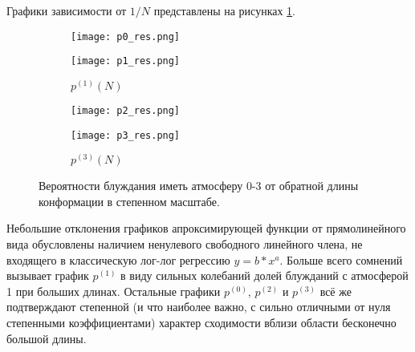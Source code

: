 Графики зависимости от $1/N$ представлены на рисунках \ref{fig:p_03_loglog}.

\begin{figure}[h]
\centering
\begin{subfigure}{0.495\textwidth}
\texttt{[image: p0\_res.png]}
\caption{$p^{(0)}(N)$}
\texttt{[image: p1\_res.png]}
\caption{$p^{(1)}(N)$}
\end{subfigure}
\hfill
\begin{subfigure}{0.495\textwidth}
\centering
\texttt{[image: p2\_res.png]}
\caption{$p^{(2)}(N)$}
\texttt{[image: p3\_res.png]}
\caption{$p^{(3)}(N)$}
\end{subfigure}
\caption{Вероятности блуждания иметь атмосферу 0-3 от обратной длины конформации в степенном масштабе.}
\label{fig:p_03_loglog}
\end{figure}

Небольшие отклонения графиков апроксимирующей функции от прямолинейного вида обусловлены наличием ненулевого свободного линейного члена,
не входящего в классическую лог-лог регрессию $y = b * x^a$.
Больше всего сомнений вызывает график $p^{(1)}$ в виду сильных колебаний долей блужданий с атмосферой 1 при больших длинах.
Остальные графики $p^{(0)}$, $p^{(2)}$ и $p^{(3)}$ всё же подтверждают степенной (и что наиболее важно, с сильно отличными от нуля степенными коэффициентами) характер сходимости вблизи области бесконечно большой длины.
